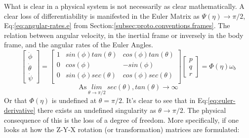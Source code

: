 \par
What is clear in a physical system is not necessarily as clear mathematically. A clear loss of differentiability is manifested in the Euler Matrix as $\Psi(\eta)\rightarrow \pi/2$, Eq:\ref{eq:angular-rates.e} from Section:\ref{subsec:proto.conventions.frames}. The relation between angular velocity, in the inertial frame or inversely in the body frame, and the angular rates of the Euler Angles.
\begin{equation}\label{eq:euler-derivative}
\begin{bmatrix}
\dot{\phi}\\
\dot{\theta}\\
\dot{\psi}
\end{bmatrix}
=\begin{bmatrix}
1 & sin(\phi)tan(\theta) & cos(\phi)tan(\theta)\\
0 & cos(\phi) & -sin(\phi)\\
0 & sin(\phi)sec(\theta) & cos(\phi)sec(\theta)\\
\end{bmatrix}
\begin{bmatrix}
p\\
q\\
r
\end{bmatrix}
=\Phi(\eta)\omega_b
\end{equation}
\begin{equation}
\text{As}~\underset{{\theta \rightarrow \pi /2}}{lim}~sec(\theta),tan(\theta)\rightarrow \infty
\end{equation}
Or that $\Phi(\eta)$ is undefined at $\theta=\pi/2$. 
It's clear to see that in Eq:\ref{eq:euler-derivative} there exists an undefined singularity as $\theta\rightarrow\pi/2$. The physical consequence of this is the loss of a degree of freedom. More specifically, if one looks at how the Z-Y-X rotation (or transformation) matrices are formulated:
